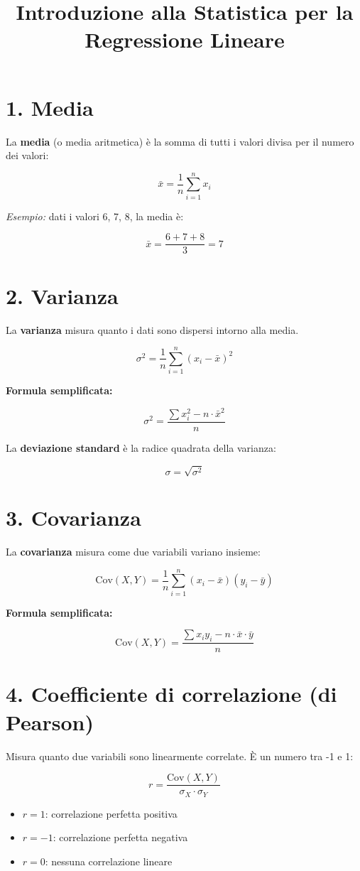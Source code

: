 \documentclass[12pt]{article}
\title{Introduzione alla Statistica per la Regressione Lineare}
\date{}
\begin{document}
\maketitle

\section*{1. Media}
La \textbf{media} (o media aritmetica) è la somma di tutti i valori divisa per il numero dei valori:

\[
\bar{x} = \frac{1}{n} \sum_{i=1}^{n} x_i
\]

\textit{Esempio:} dati i valori 6, 7, 8, la media è:

\[
\bar{x} = \frac{6+7+8}{3} = 7
\]

\section*{2. Varianza}
La \textbf{varianza} misura quanto i dati sono dispersi intorno alla media.

\[
\sigma^2 = \frac{1}{n} \sum_{i=1}^{n} (x_i - \bar{x})^2
\]

\textbf{Formula semplificata:}

\[
\sigma^2 = \frac{\sum x_i^2 - n \cdot \bar{x}^2}{n}
\]

La \textbf{deviazione standard} è la radice quadrata della varianza:

\[
\sigma = \sqrt{\sigma^2}
\]

\section*{3. Covarianza}
La \textbf{covarianza} misura come due variabili variano insieme:

\[
\text{Cov}(X,Y) = \frac{1}{n} \sum_{i=1}^{n} (x_i - \bar{x})(y_i - \bar{y})
\]

\textbf{Formula semplificata:}

\[
\text{Cov}(X,Y) = \frac{\sum x_i y_i - n \cdot \bar{x} \cdot \bar{y}}{n}
\]

\section*{4. Coefficiente di correlazione (di Pearson)}
Misura quanto due variabili sono linearmente correlate. È un numero tra -1 e 1:

\[
r = \frac{\text{Cov}(X, Y)}{\sigma_X \cdot \sigma_Y}
\]

\begin{itemize}
    \item $r = 1$: correlazione perfetta positiva
    \item $r = -1$: correlazione perfetta negativa
    \item $r = 0$: nessuna correlazione lineare
\end{itemize}
\end{document}
